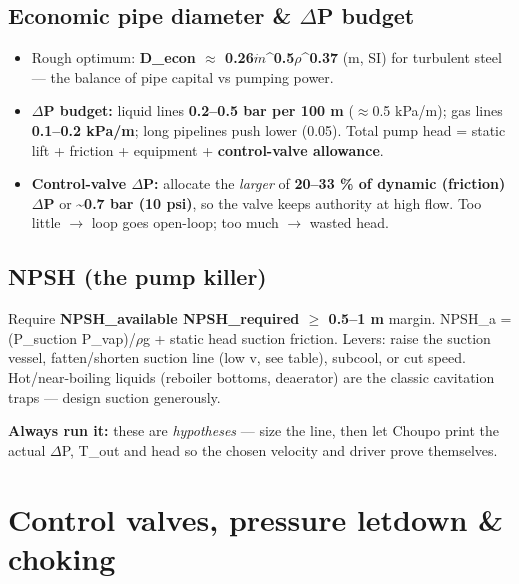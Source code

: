 \documentclass[11pt,a4paper]{article}
\providecommand{\tightlist}{\setlength{\itemsep}{0pt}\setlength{\parskip}{0pt}}
\begin{document}
\hypertarget{economic-pipe-diameter--ux3b4p-budget}{%
\subsection{Economic pipe diameter \& \(\Delta\)P
budget}\label{economic-pipe-diameter--ux3b4p-budget}}

\begin{itemize}
\tightlist
\item
  Rough optimum: \textbf{D\_econ \(\approx\) 0.26\textperiodcentered{}\(\dot{m}\)\^{}0.5\textperiodcentered{}\(\rho\)\^{}\textminus{}0.37} (m, SI) for
  turbulent steel --- the balance of pipe capital vs pumping power.
\item
  \textbf{\(\Delta\)P budget:} liquid lines \textbf{0.2--0.5 bar per 100 m} (\(\approx\)0.5
  kPa/m); gas lines \textbf{0.1--0.2 kPa/m}; long pipelines push lower
  (0.05). Total pump head = static lift + friction + equipment +
  \textbf{control-valve allowance}.
\item
  \textbf{Control-valve \(\Delta\)P:} allocate the \emph{larger} of
  \textbf{20--33 \% of dynamic (friction) \(\Delta\)P} or
  \textbf{\textasciitilde0.7 bar (10 psi)}, so the valve keeps authority
  at high flow. Too little \(\rightarrow\) loop goes open-loop; too much \(\rightarrow\) wasted
  head.
\end{itemize}

\hypertarget{npsh-the-pump-killer}{%
\subsection{NPSH (the pump killer)}\label{npsh-the-pump-killer}}

Require \textbf{NPSH\_available \textminus{} NPSH\_required \(\ge\) 0.5--1 m} margin.
NPSH\_a = (P\_suction \textminus{} P\_vap)/\(\rho\)g + static head \textminus{} suction friction.
Levers: raise the suction vessel, fatten/shorten suction line (low v,
see table), subcool, or cut speed. Hot/near-boiling liquids (reboiler
bottoms, deaerator) are the classic cavitation traps --- design suction
generously.

\textbf{Always run it:} these are \emph{hypotheses} --- size the line,
then let Choupo print the actual \(\Delta\)P, T\_out and head so the chosen
velocity and driver prove themselves.

\hypertarget{control-valves-pressure-letdown--choking}{%
\section{Control valves, pressure letdown \&
choking}\label{control-valves-pressure-letdown--choking}}
\end{document}
